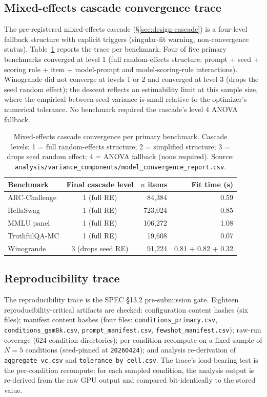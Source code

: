 \documentclass[11pt]{article}
\begin{document}
\subsection{Mixed-effects cascade convergence trace}
\label{app:cascade-trace}

The pre-registered mixed-effects cascade (§\ref{sec:design-cascade}) is a four-level fallback structure with explicit triggers (singular-fit warning, non-convergence status). Table~\ref{tab:cascade-trace} reports the trace per benchmark. Four of five primary benchmarks converged at level 1 (full random-effects structure: prompt + seed + scoring rule + item + model-prompt and model-scoring-rule interactions). Winogrande did not converge at levels 1 or 2 and converged at level 3 (drops the seed random effect); the descent reflects an estimability limit at this sample size, where the empirical between-seed variance is small relative to the optimizer's numerical tolerance. No benchmark required the cascade's level 4 ANOVA fallback.

\begin{table}[h]
\centering
\caption{Mixed-effects cascade convergence per primary benchmark. Cascade levels: 1 = full random-effects structure; 2 = simplified structure; 3 = drops seed random effect; 4 = ANOVA fallback (none required). Source: \texttt{analysis/variance\_components/model\_convergence\_report.csv}.}
\label{tab:cascade-trace}
\begin{tabular}{lcrr}
\toprule
Benchmark & Final cascade level & $n$ items & Fit time (s) \\
\midrule
ARC-Challenge & 1 (full RE) & 84{,}384 & 0.59 \\
HellaSwag & 1 (full RE) & 723{,}024 & 0.85 \\
MMLU panel & 1 (full RE) & 106{,}272 & 1.08 \\
TruthfulQA-MC & 1 (full RE) & 19{,}608 & 0.07 \\
Winogrande & 3 (drops seed RE) & 91{,}224 & 0.81 + 0.82 + 0.32 \\
\bottomrule
\end{tabular}
\end{table}

\subsection{Reproducibility trace}
\label{app:repro-trace}

The reproducibility trace is the SPEC §13.2 pre-submission gate. Eighteen reproducibility-critical artifacts are checked: configuration content hashes (six files); manifest content hashes (four files: \texttt{conditions\_primary.csv}, \texttt{conditions\_gsm8k.csv}, \texttt{prompt\_manifest.csv}, \texttt{fewshot\_manifest.csv}); raw-run coverage (624 condition directories); per-condition recompute on a fixed sample of $N = 5$ conditions (seed-pinned at \texttt{20260424}); and analysis re-derivation of \texttt{aggregate\_vc.csv} and \texttt{tolerance\_by\_cell.csv}. The trace's load-bearing test is the per-condition recompute: for each sampled condition, the analysis output is re-derived from the raw GPU output and compared bit-identically to the stored value.
\end{document}
